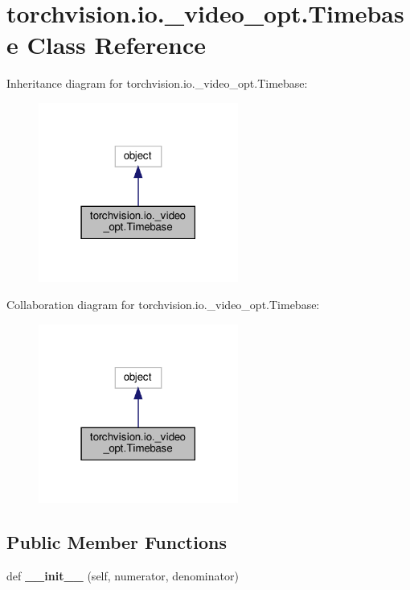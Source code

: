 \hypertarget{classtorchvision_1_1io_1_1__video__opt_1_1Timebase}{}\section{torchvision.\+io.\+\_\+video\+\_\+opt.\+Timebase Class Reference}
\label{classtorchvision_1_1io_1_1__video__opt_1_1Timebase}


Inheritance diagram for torchvision.\+io.\+\_\+video\+\_\+opt.\+Timebase\+:
\nopagebreak
\begin{figure}[H]
\begin{center}
\leavevmode
\includegraphics[width=186pt]{classtorchvision_1_1io_1_1__video__opt_1_1Timebase__inherit__graph}
\end{center}
\end{figure}


Collaboration diagram for torchvision.\+io.\+\_\+video\+\_\+opt.\+Timebase\+:
\nopagebreak
\begin{figure}[H]
\begin{center}
\leavevmode
\includegraphics[width=186pt]{classtorchvision_1_1io_1_1__video__opt_1_1Timebase__coll__graph}
\end{center}
\end{figure}
\subsection*{Public Member Functions}
\begin{DoxyCompactItemize}
\item 
\mbox{\label{classtorchvision_1_1io_1_1__video__opt_1_1Timebase_af5854d7d579a5a52ea9cfe28193c82d5}} 
def {\bfseries \+\_\+\+\_\+init\+\_\+\+\_\+} (self, numerator, denominator)
\end{DoxyCompactItemize}
